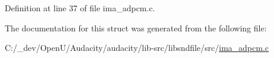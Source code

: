 Definition at line 37 of file ima\+\_\+adpcm.\+c.



The documentation for this struct was generated from the following file\+:\begin{DoxyCompactItemize}
\item 
C\+:/\+\_\+dev/\+Open\+U/\+Audacity/audacity/lib-\/src/libsndfile/src/\hyperlink{ima__adpcm_8c}{ima\+\_\+adpcm.\+c}\end{DoxyCompactItemize}
